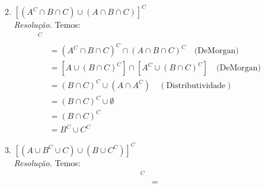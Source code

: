 \documentclass[13pt,letterpaper]{article}
\begin{document}
\begin{enumerate}
\begin{enumerate}
\begin{align*}
        \end{align*}
        \item $[(A^C \cap B \cap C) \cup (A \cap B \cap C)]^C$ \\
        \emph{Resolução.} Temos:
        \begin{align*}
            [(A^C &\cap B \cap C) \cup (A \cap B \cap C)]^C\\ &=
            (A^C \cap B \cap C)^C \cap (A \cap B \cap C)^C \quad \text{(DeMorgan)} \\ &=
            [A \cup (B \cap C)^C] \cap [A^C \cup (B \cap C)^C] \quad \text{(DeMorgan)} \\ &=
            (B \cap C)^C \cup (A \cap A^C) \quad (\text{Distributividade}) \\ &=
            (B \cap C)^C \cup \emptyset \\ &=
            (B \cap C)^C \\ &=
            B^C \cup C^C
         \end{align*}
        \item $[(A \cup B^C \cup C) \cup (B \cup C^C)]^C$ \\ 
        \emph{Resolução.} Temos:
        \begin{align*}
            [(A &\cup B^C \cup C) \cup (B \cup C^C)]^C \\ &=

\end{align*}
\end{enumerate}
\end{enumerate}
\end{document}
